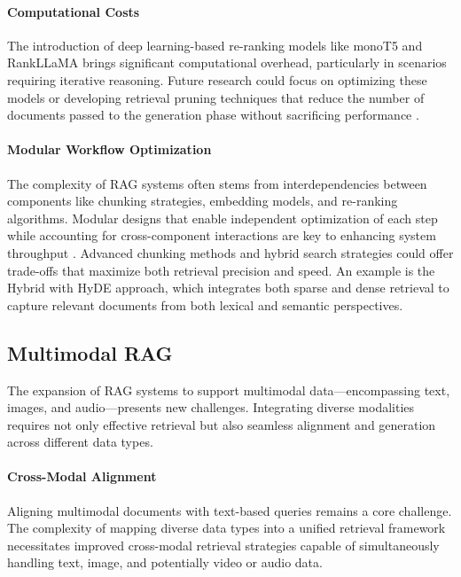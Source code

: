 \paragraph{Computational Costs}
The introduction of deep learning-based re-ranking models like monoT5 \cite{nogueira2020document} and RankLLaMA \cite{DBLP:conf/sigir/MaWYWL24} brings significant computational overhead, particularly in scenarios requiring iterative reasoning. Future research could focus on optimizing these models or developing retrieval pruning techniques that reduce the number of documents passed to the generation phase without sacrificing performance \cite{xiong2023xrr}.

\paragraph{Modular Workflow Optimization}
The complexity of RAG systems often stems from interdependencies between components like chunking strategies, embedding models, and re-ranking algorithms. Modular designs that enable independent optimization of each step while accounting for cross-component interactions are key to enhancing system throughput \cite{gao2024modular}. Advanced chunking methods and hybrid search strategies could offer trade-offs that maximize both retrieval precision and speed. An example is the Hybrid with HyDE \cite{wang2024searching} approach, which integrates both sparse and dense retrieval to capture relevant documents from both lexical and semantic perspectives.

\subsection{Multimodal RAG}

The expansion of RAG systems to support multimodal data—encompassing text, images, and audio—presents new challenges. Integrating diverse modalities requires not only effective retrieval but also seamless alignment and generation across different data types.

\paragraph{Cross-Modal Alignment}
Aligning multimodal documents with text-based queries remains a core challenge. The complexity of mapping diverse data types into a unified retrieval framework necessitates improved cross-modal retrieval strategies capable of simultaneously handling text, image, and potentially video or audio data.

